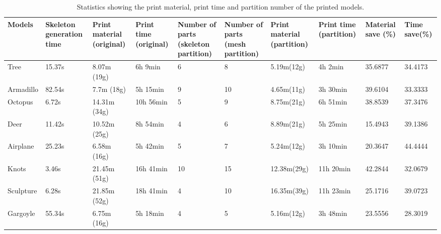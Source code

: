 \begin{table}[htb]

\begin{footnotesize}

\begin{center}

    \begin{tabular}{p{1cm} p{1cm} p{1.5cm} p{1.5cm} p{1.3cm} p{1.3cm} p{1.5cm} p{1.5cm} p{1.5cm} p{1.5cm}}

    \hline

     Models& Skeleton generation time& Print material (original)& Print time (original)& Number of parts (skeleton partition)& Number of parts (mesh partition)& Print material (partition)& Print time (partition)& Material save (\%) &Time save(\%)\\ \hline
     Tree& 15.37s& 8.07m (19g)& 6h 9min &6 & 8 &5.19m(12g) & 4h 2min & 35.6877 &34.4173\\ \hline
     Armadillo& 82.54s& 7.7m (18g)& 5h 15min &9 & 10  &4.65m(11g) & 3h 30min & 39.6104 &33.3333\\ \hline
     Octopus& 6.72s& 14.31m (34g)& 10h 56min &5 & 9  &8.75m(21g) &6h 51min & 38.8539 &37.3476\\ \hline
     Deer& 11.42s& 10.52m (25g)& 8h 54min &4 & 6  &8.89m(21g) &5h 25min & 15.4943 &39.1386\\ \hline
     Airplane& 25.23s& 6.58m (16g)& 5h 42min &5 & 7 &5.24m(12g) &3h 10min & 20.3647 &44.4444\\ \hline
     Knots& 3.46s& 21.45m (51g)& 16h 41min &10 & 15 &12.38m(29g) &11h 20min & 42.2844 &32.0679\\ \hline
     Sculpture& 6.28s& 21.85m (52g)& 18h 41min &4 & 10 &16.35m(39g) &11h 23min & 25.1716 &39.0723\\ \hline
     Gargoyle& 55.34s& 6.75m (16g)& 5h 18min &4 & 5 &5.16m(12g) &3h 48min & 23.5556 &28.3019\\ \hline

  \hline

    \end{tabular}

\end{center}

\end{footnotesize}

\caption{Statistics showing the print material, print time and partition number of the printed models.}\label{tab:ertms:summary}

\end{table}


